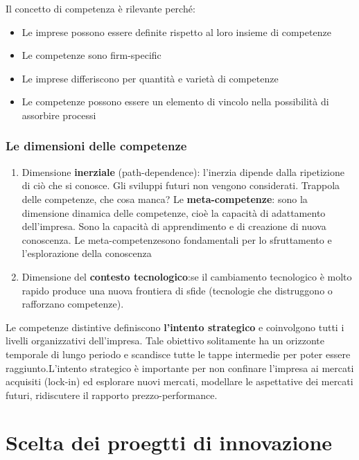 \documentclass{article}
\begin{document}
Il concetto di competenza è rilevante perché:
\begin{itemize}
\item Le imprese possono essere definite rispetto al loro insieme di competenze
\item Le competenze sono firm-specific
\item Le imprese differiscono per quantità e varietà di competenze
\item Le competenze possono essere un elemento di vincolo nella possibilità di assorbire processi
\end{itemize}
\subsubsection{Le dimensioni delle competenze}
\begin{enumerate}
\item Dimensione \textbf{inerziale} (path-dependence): l’inerzia dipende dalla ripetizione di ciò che si conosce. Gli sviluppi futuri non vengono considerati.                  
Trappola delle competenze, che cosa manca?
Le \textbf{meta-competenze}: sono la dimensione dinamica delle competenze, cioè la capacità di adattamento dell’impresa. Sono la capacità di apprendimento e di creazione di nuova conoscenza.
Le meta-competenzesono fondamentali per lo sfruttamento e l’esplorazione della conoscenza
\item Dimensione del \textbf{contesto tecnologico}:se il cambiamento tecnologico è molto rapido produce una nuova frontiera di sfide (tecnologie che distruggono o rafforzano competenze).

\end{enumerate}
Le competenze distintive definiscono \textbf{l’intento strategico} e coinvolgono tutti i livelli organizzativi dell’impresa. Tale obiettivo solitamente ha un orizzonte temporale di lungo periodo e scandisce tutte le tappe intermedie per poter essere raggiunto.L’intento strategico è importante per non confinare l’impresa ai mercati acquisiti (lock-in) ed esplorare nuovi mercati, modellare le aspettative dei mercati futuri, ridiscutere il rapporto prezzo-performance.

\section{Scelta dei proegtti di innovazione}
\end{document}
